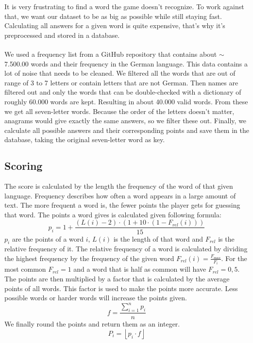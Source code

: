 \documentclass{article}[12pt]
\begin{document}
    It is very frustrating to find a word the game doesn't recognize.
    To work against that, we want our dataset to be as big as possible while still staying fast. Calculating all answers for a given word is quite expensive, that's why it's preprocessed and stored in a database.\\\\
    We used a frequency list from a GitHub
    repository that contains about $\sim$ 7.500.00 words and their frequency in the
    German language. This data contains a lot of noise that needs to be cleaned. We filtered all the words that are out of range of 3 to 7
    letters or contain letters that are not German. Then names are filtered out and only the words that can be double-checked with a dictionary of roughly 60.000 words are kept. Resulting in about 40.000 valid words.
    From these we get all seven-letter words. Because the order of the letters doesn't matter, anagrams would give exactly the same answers, so we filter these out. Finally, we calculate all possible answers and their corresponding points and save them in the database, taking the original seven-letter word as key.


    \subsection*{Scoring}\label{Scoring}

    The score is calculated by the length the frequency of the word of that
    given language. Frequency describes how often a word appears in a large
    amount of text. The more frequent a word is, the fewer points the player
    gets for guessing that word.
    The points a word gives is calculated given following formula:
    \begin{equation}
       p_i = 1 + \frac{(L(i) - 2) \cdot (1 + 10 \cdot (1 - F_{rel}(i)))}{15} 
    \end{equation}
    \noindent
    $p_i$ are the points of a word $i$, $L(i)$ is the length of that word and $F_{rel}$
    is the relative frequency of it. The relative frequency of a word is calculated by dividing the highest frequency by the frequency of the given word $F_{rel}(i)=\frac{F_{max}}{F_{i}}$. For the most common $F_{rel}=1$ and a word that is half as common will have $F_{rel}=0,5$.\\
    The points are then multiplied by a factor that is
    calculated by the average points of all words. This factor is used to make
    the points more accurate. Less possible words or harder words will increase the points given. 
    \begin{equation}
        f = \frac{\sum_{i=1}^{n} p_i}{n}
    \end{equation}
    We finally round the points and return them as an integer.
    \begin{equation}
        P_i = \left\lfloor p_i \cdot f \right\rfloor
    \end{equation}
    
\end{document}
